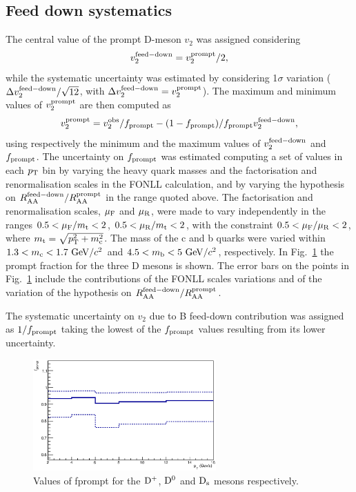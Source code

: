 \subsection{Feed down systematics}
\label{FDsystV2}
The central value of the prompt D-meson $v_2$ was assigned considering 
\begin{equation}
v_2^{\rm feed-down}=v_2^{\rm prompt}/2,
\end{equation}
while the systematic uncertainty was 
estimated by considering 1$\sigma$ variation ($\Delta v_2^{\rm feed-down}/\sqrt{12}$, with 
$\Delta v_2^{\rm feed-down} = v_2^{\rm prompt}$). 
The maximum and minimum values of $v_2^{\rm prompt}$ are then computed as
\begin{equation}
v_{2}^{\rm prompt}=v_{2}^{\rm obs}/f_{\rm prompt} - (1-f_{\rm prompt})/f_{\rm prompt}v_{2}^{\rm feed-down},
\end{equation} 
using respectively the minimum and the maximum values 
of $v_{\rm 2}^{\rm feed-down}$ and $f_{\rm prompt}$. 
The uncertainty on $f_{\rm prompt}$ was estimated 
computing a set of values in each $p_{\rm T}$ bin by
varying the heavy quark masses and the factorisation and renormalisation 
scales in the FONLL calculation, and by varying the hypothesis 
on $R_{\rm AA}^{\rm feed-down}/R_{\rm AA}^{\rm prompt}$ in the range quoted above.
The factorisation and renormalisation 
scales, $\mu_{\rm F}$ and $\mu_{\rm R}$, were made to vary independently 
in the ranges $0.5<\mu_{\rm F}/m_{\rm t}<2$, $0.5<\mu_{\rm R}/m_{\rm t}<2$, 
with the constraint $0.5<\mu_{\rm F}/\mu_{\rm R}<2$, 
where $m_{\rm t}=\sqrt{p_{\rm T}^2+m_{\rm c}^2}$.
The mass of the c and b quarks were varied within $1.3<m_{\rm c}<1.7~\mathrm{GeV}/c^2$ 
and $4.5<m_{\rm b}<5~\mathrm{GeV}/c^2$, respectively.
In Fig.~\ref{fig:fPrompt} the prompt fraction for the three D mesons is shown.
The error bars on the points in Fig.~\ref{fig:fPrompt} include the
contributions of the FONLL scales variations and of the variation of
the hypothesis on $R_{\rm AA}^{\rm feed-down}/R_{\rm AA}^{\rm prompt}$.

The systematic uncertainty on $v_2$ due to B feed-down contribution
was assigned as $1/f_{\rm prompt}$ taking the lowest of the
$f_{\rm prompt}$ values resulting from its lower uncertainty.


\begin{figure}
 \centering
 \includegraphics[width=7cm]{FigCap5/fprompt_3050.eps}
\caption{Values of fprompt for the ${\rm D^+}$, ${\rm D^0}$ and ${\rm D_s}$ mesons respectively.}
\label{fig:fPrompt}
\end{figure}


